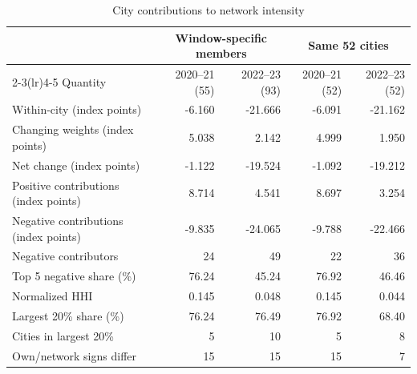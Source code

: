\begin{table}[htbp]\centering\small\caption{City contributions to network intensity}\label{tab:contributions}
\begin{tabular}{@{}p{36mm}rrrr@{}}\toprule & \multicolumn{2}{c}{Window-specific members} & \multicolumn{2}{c}{Same 52 cities}\\\cmidrule(lr){2-3}\cmidrule(lr){4-5}
Quantity & 2020--21 (55) & 2022--23 (93) & 2020--21 (52) & 2022--23 (52)\\
\midrule
Within-city (index points) & -6.160 & -21.666 & -6.091 & -21.162\\
Changing weights (index points) & 5.038 & 2.142 & 4.999 & 1.950\\
Net change (index points) & -1.122 & -19.524 & -1.092 & -19.212\\
Positive contributions (index points) & 8.714 & 4.541 & 8.697 & 3.254\\
Negative contributions (index points) & -9.835 & -24.065 & -9.788 & -22.466\\
Negative contributors & 24 & 49 & 22 & 36\\
Top 5 negative share (\%) & 76.24 & 45.24 & 76.92 & 46.46\\
Normalized HHI & 0.145 & 0.048 & 0.145 & 0.044\\
Largest 20\% share (\%) & 76.24 & 76.49 & 76.92 & 68.40\\
Cities in largest 20\% & 5 & 10 & 5 & 8\\
Own/network signs differ & 15 & 15 & 15 & 7\\
\bottomrule\end{tabular}\end{table}
